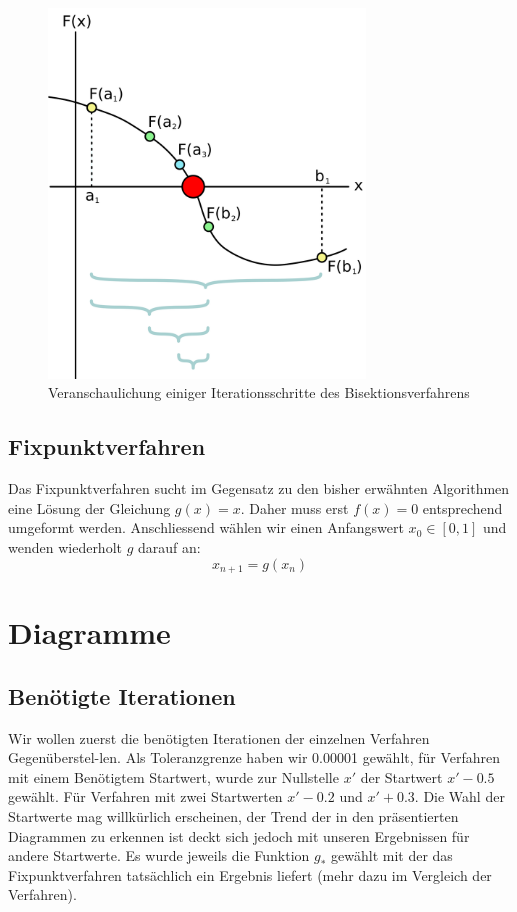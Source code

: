 \documentclass[a4paper,12pt]{article}
\newcommand{\1}{1\hspace{-0,9ex}1}
\begin{document}
\begin{figure}[H]
	\centering
	\includegraphics[width=0.75\textwidth]{plots/Bisection_method.png}
	\caption{Veranschaulichung einiger Iterationsschritte des Bisektionsverfahrens}
\end{figure}

\subsection*{Fixpunktverfahren}
Das Fixpunktverfahren sucht im Gegensatz zu den bisher erwähnten Algorithmen eine Lösung der Gleichung $g(x)=x$. Daher muss erst $f(x)=0$ entsprechend umgeformt werden. Anschliessend wählen wir einen Anfangswert $x_0\in[0,1]$ und wenden wiederholt $g$ darauf an:
\[
	x_{n+1}=g(x_n)
\]

\newpage
\section*{Diagramme}
\subsection*{Benötigte Iterationen}
Wir wollen zuerst die benötigten Iterationen der einzelnen Verfahren Gegenüberstel-len. Als Toleranzgrenze haben wir 0.00001 gewählt, für Verfahren mit einem Benötigtem Startwert, wurde zur Nullstelle $x'$ der Startwert $x'-0.5$ gewählt. Für Verfahren mit zwei Startwerten $x'-0.2$ und $x'+0.3$. Die Wahl der Startwerte mag willkürlich erscheinen, der Trend der in den präsentierten Diagrammen zu erkennen ist deckt sich jedoch mit unseren Ergebnissen für andere Startwerte. Es wurde jeweils die Funktion $g_*$ gewählt mit der das Fixpunktverfahren tatsächlich ein Ergebnis liefert (mehr dazu im Vergleich der Verfahren).
\end{document}
